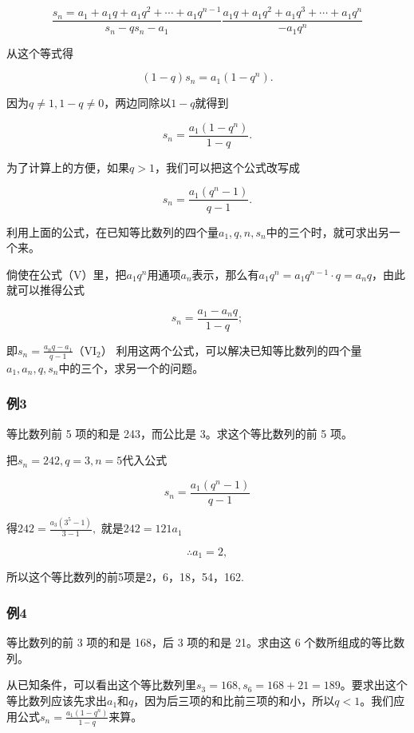 \[
\frac{s_{n} = a_{1} + a_{1} q + a_{1} q^{2} + \cdots + a_{1} q^{n - 1}}{s_{n} - q s_{n} - a_{1}} \frac{a_{1} q + a_{1} q^{2} + a_{1} q^{3} + \cdots + a_{1} q^{n}}{- a_{1} q^{n}}
\]

从这个等式得

\[
(1 - q) s_{n} = a_{1} (1 - q^{n}).
\]

因为\(q \neq 1, 1 - q \neq 0\)，两边同除以\(1 - q\)就得到

\[
s_{n} = \frac{a_{1} (1 - q^{n})}{1 - q}. \tag{V₁}
\]

为了计算上的方便，如果\(q > 1\)，我们可以把这个公式改写成

\[
s_{n} = \frac{a_{1} (q^{n} - 1)}{q - 1}. \tag{V₂}
\]

利用上面的公式，在已知等比数列的四个量\(a_1, q, n, s_n\)中的三个时，就可求出另一个来。

倘使在公式（V）里，把\(a_1q^n\)用通项\(a_{n}\)表示，那么有\(a_1q^n = a_1q^{n - 1}\cdot q = a_nq\)，由此就可以推得公式

\[
s_{n} = \frac{a_{1} - a_{n} q}{1 - q}; \tag{VI₁}
\]

即\(s_n = \frac{a_nq - a_1}{q - 1}\)（VI\(_2\)）
利用这两个公式，可以解决已知等比数列的四个量\(a_1, a_n, q, s_n\)中的三个，求另一个的问题。

\subsubsection{例3}

等比数列前 5 项的和是 243，而公比是 3。求这个等比数列的前 5 项。

 把\(s_n = 242, q = 3, n = 5\)代入公式

\[
s_{n} = \frac{a_{1} (q^{n} - 1)}{q - 1}
\]

得\(242 = \frac{a_3(3^5 - 1)}{3 - 1},\) 就是\(242 = 121a_{1}\)

\[
\therefore a_{1} = 2,
\]

所以这个等比数列的前5项是2，6，18，54，162.

\subsubsection{例4}

等比数列的前 3 项的和是 168，后 3 项的和是 21。求由这 6
个数所组成的等比数列。

从已知条件，可以看出这个等比数列里\(s_3 = 168, s_6 = 168 + 21 = 189\)。要求出这个等比数列应该先求出\(a_1\)和\(q\)，因为后三项的和比前三项的和小，所以\(q < 1\)。我们应用公式\(s_n = \frac{a_1(1 - q^n)}{1 - q}\)来算。

